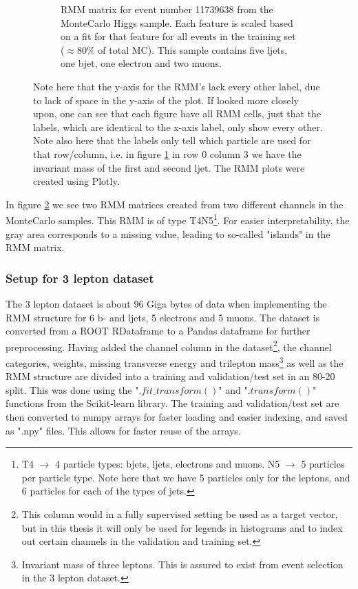\begin{figure}[H]
\begin{subfigure}{.8\textwidth}
        \caption{ RMM matrix for event number 11739638 from the MonteCarlo Higgs sample. Each feature is scaled based on a fit for that feature for 
        all events in the training set ($\approx 80\%$ of total MC). This sample contains five ljets, one bjet, one electron and two muons. }
        \label{fig:rmm_higgs_event}
    \end{subfigure}
    \hfill        
    \caption[Single event RMM plot]{Note here that the y-axis for the RMM's lack every other label, due to lack of space in the y-axis of the plot. If looked more closely upon, one can see that 
    each figure have all RMM cells, just that the labels, which are identical to the x-axis label, only show every other. Note also here that the labels only tell which particle are used for that row/column, i.e. 
    in figure \ref{fig:rmm_higgs_event} in row 0 column 3 we have the invariant mass of the first and second ljet. The RMM plots were created using 
    Plotly\cite{plotly}. }
    \label{fig:rmm_singular_events}
\end{figure}

In figure \ref{fig:rmm_singular_events} we see two RMM matrices created from two different channels in the MonteCarlo samples. 
This RMM is of type T4N5\footnote{T4 $\to$ 4 particle types: bjets, ljets, electrons and muons. N5 $\to$ 5 particles per 
particle type. Note here that we have 5 particles only for the leptons, and 6 particles for each of the types of jets.}. 
 For easier interpretability, the gray area corresponds to a missing value, leading to so-called "islands" in the RMM matrix.



\subsubsection*{Setup for 3 lepton dataset}
The 3 lepton dataset is about 96 Giga bytes of data when implementing the RMM structure for 6 b- and ljets, 5 electrons and 5 muons. The dataset 
is converted from a ROOT RDataframe to a Pandas dataframe\cite{reback2020pandas} for further preprocessing. Having added the channel column in 
the dataset\footnote{This column would in a fully supervised setting be used as a target vector, but in this thesis it will only be used for legends in
histograms and to index out certain channels in the validation and training set. }, the channel categories, weights, missing transverse energy and 
trilepton mass\footnote{Invariant mass of three leptons. This is assured to exist from event selection in the 3 lepton dataset.} as well as the RMM structure are divided into 
a training and validation/test set in an 80-20 split. This was done using the "$.fit\_transform()$" and "$.transform()$" functions from the 
Scikit-learn library\cite{scikit-learn}. The training and validation/test set are then converted to numpy arrays\cite{harris2020array} for faster 
loading and easier indexing, and saved as ".npy" files. This allows for faster reuse of the arrays. 


